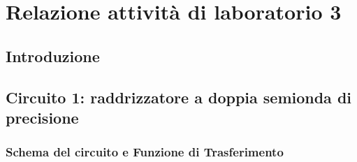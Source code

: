 \documentclass{report}
\begin{document}
\addtocounter{chapter}{+2}
	\begin{frontespizio}
		\Margini{3cm}{3cm}{3cm}{3cm}
		\Punteggiatura{}
		\begin{Preambolo*}
			\usepackage[italian]{babel}
			\usepackage[T1]{fontenc}
			\usepackage[utf8]{inputenc}
			\usepackage{microtype}
			\usepackage{lmodern}
			\graphicspath{{img/}}
			
			\renewcommand{\frontinstitutionfont}{\fontsize{14}{17}\bfseries\scshape}
			\renewcommand{\fronttitlefont}{\fontsize{17}{21}\bfseries\scshape}
			\renewcommand{\frontfootfont}{\fontsize{12}{14}\bfseries\scshape}
		\end{Preambolo*}
	\end{frontespizio}

\newpage
\null
\thispagestyle{empty}
\newpage

\chapter{Relazione attività di laboratorio 3}
\section*{Introduzione}
\newpage
\section{Circuito 1: raddrizzatore a doppia semionda di precisione}
\subsection{Schema del circuito e Funzione di Trasferimento}
\end{document}
